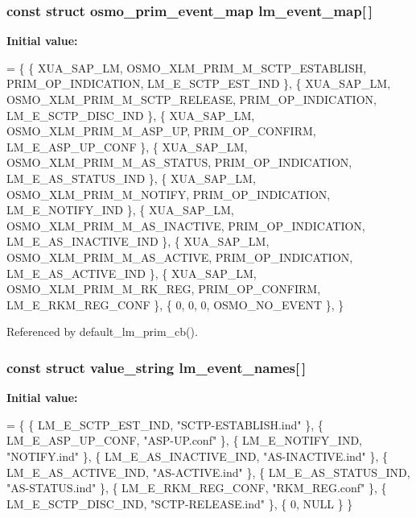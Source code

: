 \subsubsection[{lm\+\_\+event\+\_\+map}]{\setlength{\rightskip}{0pt plus 5cm}const struct osmo\+\_\+prim\+\_\+event\+\_\+map lm\+\_\+event\+\_\+map[$\,$]\hspace{0.3cm}{\ttfamily [static]}}\label{xua__default__lm__fsm_8c_a51949de02d1451a339c030bfa04e58f0}
{\bfseries Initial value\+:}
\begin{DoxyCode}
= \{
        \{ XUA_SAP_LM, OSMO_XLM_PRIM_M_SCTP_ESTABLISH, PRIM\_OP\_INDICATION, 
      LM_E_SCTP_EST_IND \},
        \{ XUA_SAP_LM, OSMO_XLM_PRIM_M_SCTP_RELEASE, PRIM\_OP\_INDICATION, 
      LM_E_SCTP_DISC_IND \},
        \{ XUA_SAP_LM, OSMO_XLM_PRIM_M_ASP_UP, PRIM\_OP\_CONFIRM, LM_E_ASP_UP_CONF \},
        \{ XUA_SAP_LM, OSMO_XLM_PRIM_M_AS_STATUS, PRIM\_OP\_INDICATION, 
      LM_E_AS_STATUS_IND \},
        \{ XUA_SAP_LM, OSMO_XLM_PRIM_M_NOTIFY, PRIM\_OP\_INDICATION, 
      LM_E_NOTIFY_IND \},
        \{ XUA_SAP_LM, OSMO_XLM_PRIM_M_AS_INACTIVE, PRIM\_OP\_INDICATION, 
      LM_E_AS_INACTIVE_IND \},
        \{ XUA_SAP_LM, OSMO_XLM_PRIM_M_AS_ACTIVE, PRIM\_OP\_INDICATION, 
      LM_E_AS_ACTIVE_IND \},
        \{ XUA_SAP_LM, OSMO_XLM_PRIM_M_RK_REG, PRIM\_OP\_CONFIRM, LM_E_RKM_REG_CONF \},
        \{ 0, 0, 0, OSMO\_NO\_EVENT \},
\}
\end{DoxyCode}


Referenced by default\+\_\+lm\+\_\+prim\+\_\+cb().

\subsubsection[{lm\+\_\+event\+\_\+names}]{\setlength{\rightskip}{0pt plus 5cm}const struct value\+\_\+string lm\+\_\+event\+\_\+names[$\,$]\hspace{0.3cm}{\ttfamily [static]}}\label{xua__default__lm__fsm_8c_a524a2ce1ebc7967814b338b51f576a55}
{\bfseries Initial value\+:}
\begin{DoxyCode}
= \{
        \{ LM_E_SCTP_EST_IND,    \textcolor{stringliteral}{"SCTP-ESTABLISH.ind"} \},
        \{ LM_E_ASP_UP_CONF,     \textcolor{stringliteral}{"ASP-UP.conf"} \},
        \{ LM_E_NOTIFY_IND,      \textcolor{stringliteral}{"NOTIFY.ind"} \},
        \{ LM_E_AS_INACTIVE_IND, \textcolor{stringliteral}{"AS-INACTIVE.ind"} \},
        \{ LM_E_AS_ACTIVE_IND,   \textcolor{stringliteral}{"AS-ACTIVE.ind"} \},
        \{ LM_E_AS_STATUS_IND,   \textcolor{stringliteral}{"AS-STATUS.ind"} \},
        \{ LM_E_RKM_REG_CONF,    \textcolor{stringliteral}{"RKM\_REG.conf"} \},
        \{ LM_E_SCTP_DISC_IND,   \textcolor{stringliteral}{"SCTP-RELEASE.ind"} \},
        \{ 0, NULL \}
\}
\end{DoxyCode}
